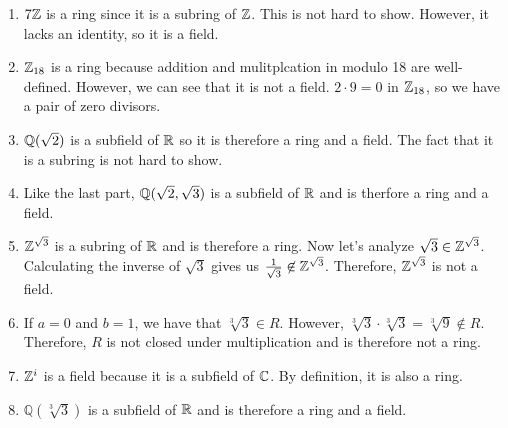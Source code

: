 \documentclass[12pt]{report}
\begin{document}
\sol
\begin{enumerate}[label=\alph*.]
    \item $7 \ZZ$ is a ring since it is a subring of $\ZZ$. This is not hard to show. However, it lacks an identity, so it is a field. 
    \item $\ZZ_{18}$ is a ring because addition and mulitplcation in modulo 18 are well-defined. However, we can see that it is not a field. $2 \cdot 9 = 0$ in $\ZZ_{18}$, so we have a pair of zero divisors.
    \item $\QQ(\sqrt{2})$ is a subfield of $\RR$ so it is therefore a ring and a field. The fact that it is a subring is not hard to show.
    \item Like the last part, $\QQ(\sqrt{2}, \sqrt{3})$ is a subfield of $\RR$ and is therfore a ring and a field.
    \item $\ZZ[\sqrt{3}]$ is a subring of $\RR$ and is therefore a ring. Now let's analyze $\sqrt{3} \in \ZZ[\sqrt{3}]$. Calculating the inverse of $\sqrt{3}$ gives us $\frac{1}{\sqrt{3}} \not\in \ZZ[\sqrt{3}]$. Therefore, $\ZZ[\sqrt{3}]$ is not a field.
    \item If $a=0$ and $b=1$, we have that $\sqrt[3]{3} \in R$. However, $\sqrt[3]{3} \cdot \sqrt[3]{3} = \sqrt[3]{9} \not\in R$. Therefore, $R$ is not closed under multiplication and is therefore not a ring.
    \item $\ZZ[i]$ is a field because it is a subfield of $\CC$. By definition, it is also a ring.
    \item ${\mathbb Q}( \sqrt[3]{3})$ is a subfield of $\RR$ and is therefore a ring and a field.
\end{enumerate}
\end{document}
